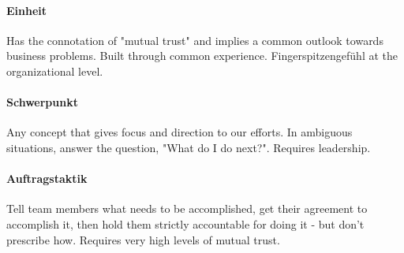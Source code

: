 \documentclass[a4paper]{extarticle}
\begin{document}
\paragraph{Einheit} Has the connotation of "mutual trust" and implies a common outlook towards business problems. Built through common experience. Fingerspitzengefühl at the organizational level.

\paragraph{Schwerpunkt} Any concept that gives focus and direction to our efforts. In ambiguous situations, answer the question, "What do I do next?". Requires leadership.

\paragraph{Auftragstaktik} Tell team members what needs to be accomplished, get their agreement to accomplish it, then hold them strictly accountable for doing it - but don't prescribe how. Requires very high levels of mutual trust.
\end{document}
